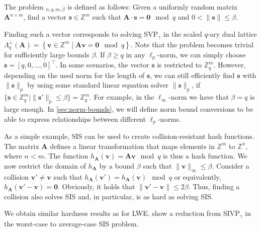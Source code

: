 \begin{definition}
    The problem $_{n, q, m, \beta}$ is defined as follows: Given a uniformly random matrix $\mathbf{A}^{n\times m}$, find a vector $\mathbf{s} \in \mathbb{Z}^m$ such that $\mathbf{A} \cdot \mathbf{s} = \mathbf{0} \mod q$ and $0 < \| \mathbf{s}\| \leq \beta$.
\end{definition}

Finding such a vector corresponds to solving SVP$_\gamma$ in the scaled $q$-ary dual lattice $\Lambda_q^\perp(\mathbf{A}) = \left\{ \mathbf{v} \in \mathbb{Z}^m \mid  \mathbf{A}\mathbf{v} = \mathbf{0} \mod q \right\}$. Note that the problem becomes trivial for sufficiently large bounds $\beta$. If $\beta\geq q$ in any $\ell_p$-norm, we can simply choose $\mathbf{s} = [q, 0, \dots, 0]^\intercal$. In some scenarios, the vector $\mathbf{s}$ is restricted to $\mathbb{Z}_q^m$. However, depending on the used norm for the length of $\mathbf{s}$, we can still efficiently find $\mathbf{s}$ with $\|\mathbf{s}\|_p$ by using some standard linear equation solver $\|\mathbf{s}\|_p$, if $\{\mathbf{s}\in \mathbb{Z}_q^m \mid \|\mathbf{s}'\|_p \leq \beta\} = \mathbb{Z}_q^m$. For example, in the $\ell_\infty$-norm we have that $\beta=q$ is large enough. In \cref{sec:norm-bounds}, we will define norm bound conversions to be able to express relationships between different  $\ell_p$-norms.

As a simple example, SIS can be used to create collision-resistant hash functions. The matrix $\mathbf{A}$ defines a linear transformation that maps elements in  $\mathbb{Z}^m$ to  $\mathbb{Z}^n$, where $n < m$. The function $h_\mathbf{A}(\mathbf{v}) = \mathbf{A} \mathbf{v} \mod q$ is thus a hash function. We now restrict the domain of $h_\mathbf{A}$ by a bound $\beta$ such that $\|\mathbf{v}\|_\infty \leq \beta$. Consider a collision $\mathbf{v}' \neq \mathbf{v}$ such that $h_\mathbf{A}(\mathbf{v}') = h_\mathbf{A}(\mathbf{v}) \mod q$ or equivalently, $h_\mathbf{A}(\mathbf{v}' - \mathbf{v}) = \mathbf{0}$. Obviously, it holds that $\|\mathbf{v}' - \mathbf{v}\| \leq 2\beta$. Thus, finding a collision also solves SIS and, in particular, is as hard as solving SIS.

We obtain similar hardness results as for LWE.  \citet{MR04} show a reduction from SIVP$_\gamma$ in the worst-case to average-case SIS problem.

